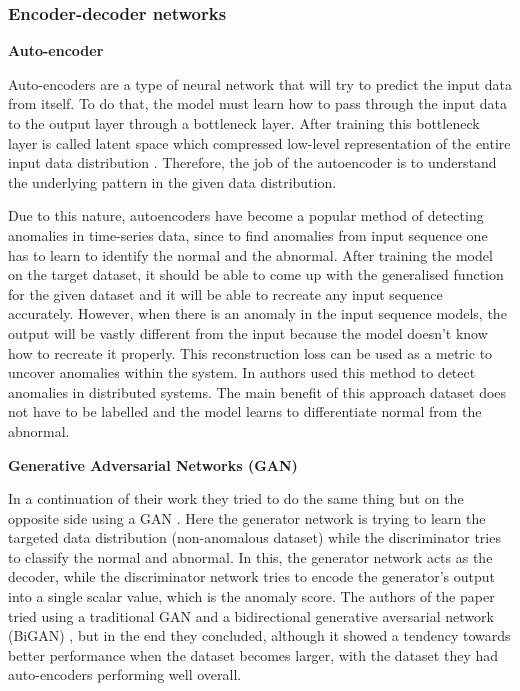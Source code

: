 \subsubsection{Encoder-decoder networks}

\textbf{Auto-encoder}

\noindent Auto-encoders are a type of neural network that will try to predict the input data from itself. To do that, the model must learn how to pass through the input data to the output layer through a bottleneck layer. After training this bottleneck layer is called latent space which compressed low-level representation of the entire input data distribution \citep{hinton2006reducing}. Therefore, the job of the autoencoder is to understand the underlying pattern in the given data distribution.


Due to this nature, autoencoders have become a popular method of detecting anomalies in time-series data, since to find anomalies from input sequence one has to learn to identify the normal and the abnormal. After training the model on the target dataset, it should be able to come up with the generalised function for the given dataset and it will be able to recreate any input sequence accurately. However, when there is an anomaly in the input sequence models, the output will be vastly different from the input because the model doesn't know how to recreate it properly. This reconstruction loss can be used as a metric to uncover anomalies within the system. In \cite{kumarage2018anomaly} authors used this method to detect anomalies in distributed systems. The main benefit of this approach dataset does not have to be labelled and the model learns to differentiate normal from the abnormal.



\noindent \textbf{Generative Adversarial Networks (GAN)}

\noindent In a continuation of their work \cite{kumarage2019generative} they tried to do the same thing but on the opposite side using a GAN \citep{goodfellow2014generative}. Here the generator network is trying to learn the targeted data distribution (non-anomalous dataset) while the discriminator tries to classify the normal and abnormal. In this, the generator network acts as the decoder, while the discriminator network tries to encode the generator's output into a single scalar value, which is the anomaly score. The authors of the paper tried using a traditional GAN and a bidirectional generative aversarial network (BiGAN) \citep{donahue2016adversarial}, but in the end they concluded, although it showed a tendency towards better performance when the dataset becomes larger, with the dataset they had auto-encoders performing well overall.

